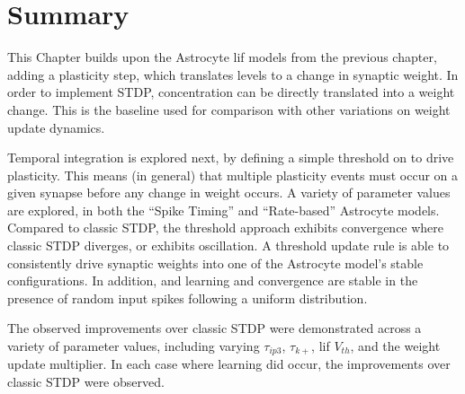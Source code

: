 \section{Summary}

This Chapter builds upon the Astrocyte \Gls{lif} models from the previous chapter,
adding a plasticity step, which translates \ca levels to a change
in synaptic weight. In order to implement STDP, \ca concentration can be directly
translated into a weight change. This is the baseline used for comparison with
other variations on weight update dynamics.

Temporal integration is explored next, by defining a simple threshold on
\ca to drive plasticity. This means (in general) that multiple plasticity events
must occur on a given synapse before any change in weight occurs. A variety of
parameter values are explored, in both the ``Spike Timing'' and ``Rate-based''
Astrocyte models. Compared to classic STDP, the threshold approach exhibits
convergence where classic STDP diverges, or exhibits oscillation. A threshold
update rule is able to consistently drive synaptic weights into one of the
Astrocyte model's stable configurations. In addition, and learning and
convergence are stable in the presence of random input spikes following a
uniform distribution.

The observed improvements over classic STDP were demonstrated across a variety
of parameter values, including varying $\tau_{ip3}$, $\tau_{k+}$, \Gls{lif} $V_{th}$,
and the weight update multiplier. In each case where learning did occur, the
improvements over classic STDP were observed.

